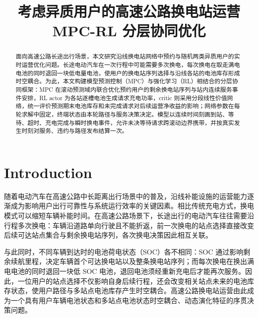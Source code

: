 \documentclass[12pt,a4paper,UTF8]{ctexart}
\begin{document}
\cover

\newpage
\begin{abstract}

面向高速公路长途出行场景，本文研究沿线换电站网络中预约与随机两类异质用户的实时运营优化问题。长途电动汽车在一次行程中可能需要多次换电，每次换电在取走满电电池的同时退回一块低电量电池，使用户的换电站序列选择与沿线各站的电池库存形成时空耦合。为此，本文构建模型预测控制（MPC）与强化学习（RL）相结合的分层协同框架：MPC 在滚动预测域内联合优化预约用户的剩余换电站序列与站内连续服务事件安排，RL actor 为各站逐槽电池生成请求充电功率，critic 则采用分段线性价值网络，统一评价预测期末电池库存和未完成请求对后续运营净收益的影响；网络参数在每轮求解中固定，终端状态由本轮路径与服务决策决定。模型以连续时间刻画到站、等待、超时、充电完成与瞬时换电事件，允许未决等待请求跨滚动边界携带，并按真实发生时刻对服务、违约与路径发布结算一次。

\end{abstract}
\newpage

\thispagestyle{empty} %

\newpage
\tableofcontents

\newpage

\begin{center}
   \title{ \Huge \textbf{{考虑异质用户的高速公路换电站运营 MPC-RL 分层协同优化}}}
\end{center}


\section{Introduction}
随着电动汽车在高速公路中长距离出行场景中的普及，沿线补能设施的运营能力逐渐成为影响用户出行可靠性与系统运行效率的关键因素。相比传统充电方式，换电模式可以缩短车辆补能时间。在高速公路场景下，长途出行的电动汽车往往需要沿行程多次换电：车辆沿道路单向行驶且不能折返，前一次换电的站点选择直接改变后续可达站点集合与剩余换电站序列，各次换电决策因此相互关联。

与此同时，不同车辆到达时的电池荷电状态（SOC）各不相同：SOC 通过影响剩余续航里程，决定车辆首个可达换电站以及整条换电站序列；而每次换电在换出满电电池的同时退回一块低 SOC 电池，退回电池须经重新充电后才能再次服务。因此，一位用户的站点选择不仅影响自身后续行程，还会改变相关站点未来的电池库存状态，使用户路径与多站点电池库存产生时空耦合。高速公路换电站运营由此成为一个具有用户车辆电池状态和多站点电池状态时空耦合、动态演化特征的序贯决策问题。
\end{document}
